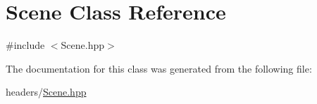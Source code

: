 \hypertarget{class_scene}{}\section{Scene Class Reference}
\label{class_scene}


{\ttfamily \#include $<$Scene.\+hpp$>$}



The documentation for this class was generated from the following file\+:\begin{DoxyCompactItemize}
\item 
headers/\mbox{\hyperlink{_scene_8hpp}{Scene.\+hpp}}\end{DoxyCompactItemize}
